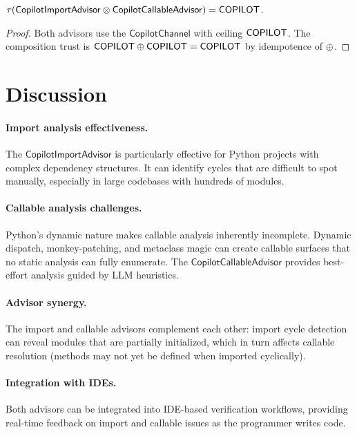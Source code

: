 \documentclass[11pt]{article}
\newcommand{\ImportAdv}{\mathsf{CopilotImportAdvisor}}
\newcommand{\CallAdv}{\mathsf{CopilotCallableAdvisor}}
\newcommand{\CopChan}{\mathsf{CopilotChannel}}
\newcommand{\AdvCompose}{\otimes}
\begin{document}
\begin{theorem}
\label{thm:comp-trust}
$\tau(\ImportAdv \AdvCompose \CallAdv) = \Tcopilot$.
\end{theorem}

\begin{proof}
Both advisors use the $\CopChan$ with ceiling $\mathsf{COPILOT}$.
The composition trust is $\mathsf{COPILOT} \oplus \mathsf{COPILOT} = \mathsf{COPILOT}$
by idempotence of $\oplus$.
\end{proof}

\section{Discussion}
\label{sec:discussion}

\paragraph{Import analysis effectiveness.}
The $\ImportAdv$ is particularly effective for Python projects
with complex dependency structures.  It can identify cycles that
are difficult to spot manually, especially in large codebases
with hundreds of modules.

\paragraph{Callable analysis challenges.}
Python's dynamic nature makes callable analysis inherently
incomplete.  Dynamic dispatch, monkey-patching, and metaclass
magic can create callable surfaces that no static analysis can
fully enumerate.  The $\CallAdv$ provides best-effort analysis
guided by LLM heuristics.

\paragraph{Advisor synergy.}
The import and callable advisors complement each other: import
cycle detection can reveal modules that are partially initialized,
which in turn affects callable resolution (methods may not yet
be defined when imported cyclically).

\paragraph{Integration with IDEs.}
Both advisors can be integrated into IDE-based verification
workflows, providing real-time feedback on import and callable
issues as the programmer writes code.
\end{document}
